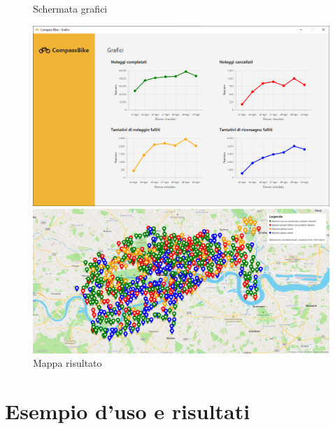 \documentclass[a4paper, 12pt]{article}
\begin{document}
	\begin{figure}[H]
	\caption{Schermata grafici}
	\label{charts}
	\hfill \includegraphics[width=\textwidth]{resources/images/screenshot/Charts.png} \hspace*{\fill}

	\caption{Mappa risultato}
	\label{map}
	\hfill \includegraphics[width=\textwidth]{resources/images/screenshot/Map.png} \hspace*{\fill}
	\end{figure}	
	

\newpage


\section{Esempio d'uso e risultati}
\end{document}
